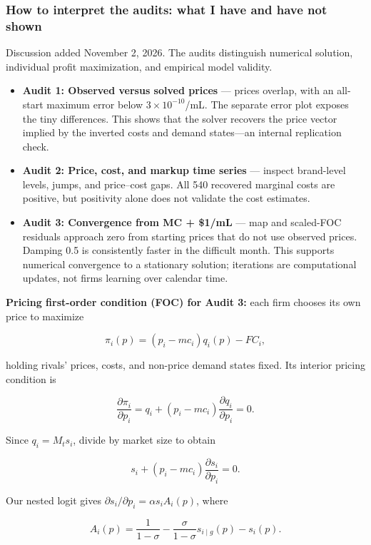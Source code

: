 \documentclass[10pt,]{article}
\begin{document}
\subsubsection{How to interpret the audits: what I have and have not
shown}\label{how-to-interpret-the-audits-what-i-have-and-have-not-shown}

Discussion added November 2, 2026. The audits distinguish numerical
solution, individual profit maximization, and empirical model validity.

\begin{itemize}
\item
  \textbf{Audit 1: Observed versus solved prices} --- prices overlap,
  with an all-start maximum error below \(3\times10^{-10}\)/mL. The
  separate error plot exposes the tiny differences. This shows that the
  solver recovers the price vector implied by the inverted costs and
  demand states---an internal replication check.
\item
  \textbf{Audit 2: Price, cost, and markup time series} --- inspect
  brand-level levels, jumps, and price--cost gaps. All 540 recovered
  marginal costs are positive, but positivity alone does not validate
  the cost estimates.
\item
  \textbf{Audit 3: Convergence from MC + \$1/mL} --- map and scaled-FOC
  residuals approach zero from starting prices that do not use observed
  prices. Damping 0.5 is consistently faster in the difficult month.
  This supports numerical convergence to a stationary solution;
  iterations are computational updates, not firms learning over calendar
  time.
\end{itemize}

\textbf{Pricing first-order condition (FOC) for Audit 3:} each firm
chooses its own price to maximize

\[
  \pi_i(p)=(p_i-mc_i)q_i(p)-FC_i,
  \]

holding rivals' prices, costs, and non-price demand states fixed. Its
interior pricing condition is

\[
  \frac{\partial\pi_i}{\partial p_i}
  =q_i+(p_i-mc_i)\frac{\partial q_i}{\partial p_i}=0.
  \]

Since \(q_i=M_ts_i\), divide by market size to obtain

\[
  s_i+(p_i-mc_i)\frac{\partial s_i}{\partial p_i}=0.
  \]

Our nested logit gives \(\partial s_i/\partial p_i=\alpha s_iA_i(p)\),
where

\[
  A_i(p)=\frac{1}{1-\sigma}
  -\frac{\sigma}{1-\sigma}s_{i\mid g}(p)-s_i(p).
  \]
\end{document}

